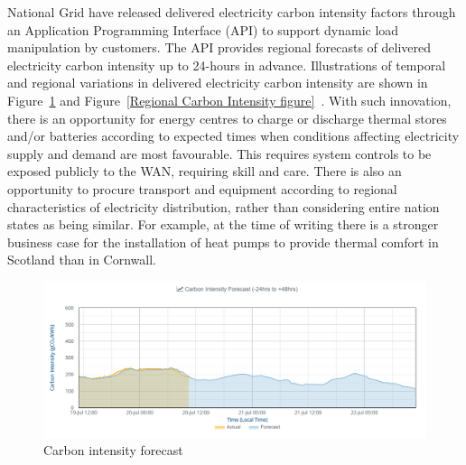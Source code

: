 \documentclass[11pt, oneside]{book}   	%
\begin{document}
National Grid have released delivered electricity carbon intensity factors through an Application Programming Interface (API) to support dynamic load manipulation by customers.
The API provides regional forecasts of delivered electricity carbon intensity up to 24-hours in advance.
Illustrations of temporal and regional variations in delivered electricity carbon intensity are shown in Figure~\ref{Carbon Intensity Forecast figure} and Figure~\ref{Regional Carbon Intensity figure}~\cite{ngrid1}.
With such innovation, there is an opportunity for energy centres to charge or discharge thermal stores and/or batteries according to expected times when conditions affecting electricity supply and demand are most favourable.
This requires system controls to be exposed publicly to the WAN, requiring skill and care.
There is also an opportunity to procure transport and equipment according to regional characteristics of electricity distribution, rather than considering entire nation states as being similar.
For example, at the time of writing there is a stronger business case for the installation of heat pumps to provide thermal comfort in Scotland than in Cornwall.\

\pagebreak

\FloatBarrier
\begin{figure}
\begin{center}
\includegraphics[width=1\textwidth]{carbonIntensityForecast.png}
\caption{Carbon intensity forecast}
\label{Carbon Intensity Forecast figure}
\end{center}
\end{figure}
\FloatBarrier

\pagebreak
\end{document}
